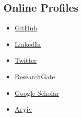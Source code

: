\documentclass[11pt,a4paper,sans]{moderncv}        %
\begin{document}
\vspace{5pt}

\subsection{Online Profiles}

\vspace{5pt}
\small{
\begin{itemize}
\item{\textcolor{blue}{\underline{\href{https://github.com/LachlanMarnham}{GitHub}}}}

\vspace{6pt}


\item{\textcolor{blue}{\underline{\href{http://linkedin.com/in/lachlan-marnham-a463b190}{LinkedIn}}}}

\vspace{6pt}

\item{\textcolor{blue}{\underline{\href{https://twitter.com/LachlanMarnham}{Twitter}}}}

\vspace{6pt}

\item{\textcolor{blue}{\underline{\href{https://www.researchgate.net/profile/Lachlan_Marnham}{ResearchGate}}}}

\vspace{6pt}

\item{\textcolor{blue}{\underline{\href{https://scholar.google.co.uk/citations?user=5Vi60LYAAAAJ&hl=en}{Google Scholar}}}}

\vspace{6pt}

\item{\textcolor{blue}{\underline{\href{http://arxiv.org/a/marnham_l_1.html}{Ar$\chi$iv}}}}

\end{itemize}
}



\end{document}
